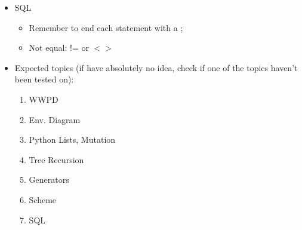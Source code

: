 \documentclass{article}
\begin{document}
\begin{itemize}
	\item SQL
	\begin{itemize}
		\item Remember to end each statement with a ;
		\item Not equal: != or $<>$
	\end{itemize}
	\item Expected topics (if have absolutely no idea, check if one of the topics haven't been tested on):
	\begin{enumerate}
		\item WWPD
		\item Env. Diagram
		\item Python Lists, Mutation
		\item Tree Recursion
		\item Generators
		\item Scheme
		\item SQL
	\end{enumerate}

\end{itemize}
\end{document}

